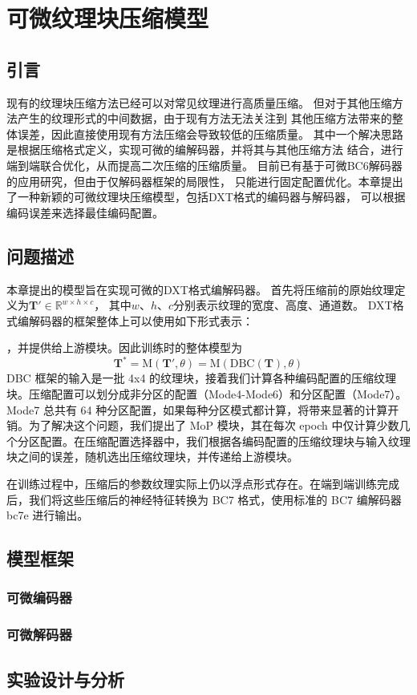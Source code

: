
\chapter{可微纹理块压缩模型}

\section{引言}

现有的纹理块压缩方法已经可以对常见纹理进行高质量压缩。
但对于其他压缩方法产生的纹理形式的中间数据，由于现有方法无法关注到
其他压缩方法带来的整体误差，因此直接使用现有方法压缩会导致较低的压缩质量。
其中一个解决思路是根据压缩格式定义，实现可微的编解码器，并将其与其他压缩方法
结合，进行端到端联合优化，从而提高二次压缩的压缩质量。
目前已有基于可微BC6解码器的应用研究，但由于仅解码器框架的局限性，
只能进行固定配置优化。本章提出了一种新颖的可微纹理块压缩模型，包括DXT格式的编码器与解码器，
可以根据编码误差来选择最佳编码配置。

\section{问题描述}
本章提出的模型旨在实现可微的DXT格式编解码器。
首先将压缩前的原始纹理定义为$\mathbf{T}'\in \mathbb{R}^{w\times h\times c}$，
其中$w$、$h$、$c$分别表示纹理的宽度、高度、通道数。
DXT格式编解码器的框架整体上可以使用如下形式表示：

 ，并提供给上游模块。因此训练时的整体模型为
\begin{equation}
\mathbf{T}^*=\text{M}(\mathbf{T}',\theta)=\text{M}(\text{DBC}(\mathbf{T}),\theta)
\end{equation}
DBC 框架的输入是一批 4x4 的纹理块，接着我们计算各种编码配置的压缩纹理块。压缩配置可以划分成非分区的配置（Mode4-Mode6）和分区配置（Mode7）。Mode7 总共有 64 种分区配置，如果每种分区模式都计算，将带来显著的计算开销。为了解决这个问题，我们提出了 MoP 模块，其在每次 epoch 中仅计算少数几个分区配置。在压缩配置选择器中，我们根据各编码配置的压缩纹理块与输入纹理块之间的误差，随机选出压缩纹理块，并传递给上游模块。

在训练过程中，压缩后的参数纹理实际上仍以浮点形式存在。在端到端训练完成后，我们将这些压缩后的神经特征转换为 BC7 格式，使用标准的 BC7 编解码器 bc7e 进行输出。
\section{模型框架}
\subsection{可微编码器}
\subsection{可微解码器}
\section{实验设计与分析}


